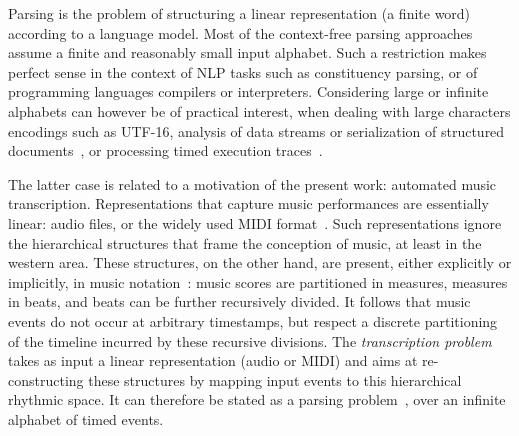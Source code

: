 %
%
Parsing is the problem
of structuring a linear representation
(a finite word) according to a language model. %
%
Most of the context-free parsing approaches~\cite{GruneJacobs08parsing}
assume a finite and reasonably small input alphabet. %
Such a restriction makes perfect sense in the context of
NLP tasks such as constituency parsing,
or of programming languages compilers or interpreters.
Considering large or infinite alphabets can however be of
practical interest, when dealing with large characters encodings such as UTF-16,
%
analysis of data streams or serialization of structured documents~\cite{Segoufin06csl},
or processing timed execution traces~\cite{Bouyer03algebraic}.
%

The latter case is related to a motivation  of  the present work:
automated music transcription. Representations that capture  music performances
are
essentially linear:   audio files, or the widely used MIDI format~\cite{?}.
Such representations ignore the hierarchical structures that frame the
conception of music, at least in the western area. These structures, on the other hand,
are present, either explicitly  or implicitly,
in music notation~\cite{Gould11Notation}: music scores are partitioned in measures, measures
in beats, and beats can be further recursively divided.
It follows that music events do not occur at arbitrary timestamps,
but respect a discrete partitioning of the  timeline incurred by
these recursive divisions.
The \emph{transcription problem} takes
as input a linear representation (audio or MIDI) and aims at re-constructing
these structures
by mapping input events to this hierarchical rhythmic space.
It can therefore be stated as a parsing problem~\cite{foscarin:hal-01988990},
over an infinite alphabet of timed events.

